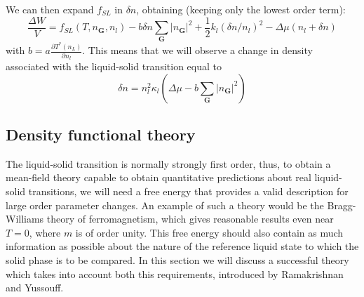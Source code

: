 \documentclass[12pt,a4paper]{article}
\begin{document}
We can then expand $f_{SL}$ in $\delta n$, obtaining (keeping only the lowest order term):
\begin{equation}
\frac{\Delta W}{V}=f_{SL}(T,n_{\textbf{G}},n_l)-b\delta n\sum_{\textbf{G}} |n_{\textbf{G}}|^2+\frac{1}{2}k_l(\delta n /n_l)^2 - \Delta \mu(n_l+\delta n)
\end{equation}
with $b=a \frac{\partial T^* (n_L)}{ \partial n_l}$.
This means that we will observe a change in density associated with the liquid-solid transition equal to
\begin{equation}
\delta n = n^2_l \kappa_l (\Delta \mu -b \sum_{\textbf{G}}|n_{\textbf{G}}|^2)
\end{equation}

\subsection{Density functional theory}
The liquid-solid transition is normally strongly first order, thus, to obtain a mean-field theory capable to obtain quantitative predictions about real liquid-solid transitions, we will need a free energy that provides a valid description for large order parameter changes. An example of such a theory would be the Bragg-Williams theory of ferromagnetism, which gives reasonable results even near $T=0$, where $m$ is of order unity. This free energy should also contain as much information as possible about the nature of the reference liquid state to which the solid phase is to be compared. 
In this section we will discuss a successful theory which takes into account both this requirements, introduced by Ramakrishnan and Yussouff.
\end{document}
